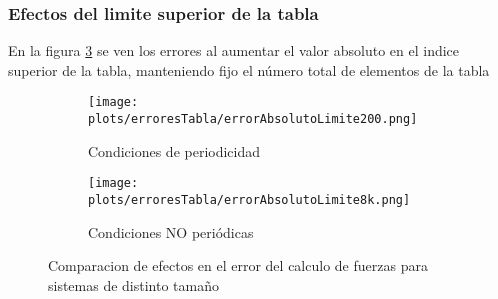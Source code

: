 % 


% 
% 
% 
% 


\subsubsection{Efectos del limite superior de la tabla}

En la figura \ref{time-vs-cut-error-superior} se ven los errores al aumentar el valor absoluto en el indice superior de la tabla, manteniendo fijo el número total de elementos de la tabla 
\begin{figure}[htbp]
\centering
\begin{subfigure}[b]{\plotwidthtres}
   \texttt{[image: plots/erroresTabla/errorAbsolutoLimite200.png]}
   \caption{Condiciones de periodicidad}
   \label{compar-1iter}
 \end{subfigure}
\begin{subfigure}[b]{\plotwidthtres}
   \texttt{[image: plots/erroresTabla/errorAbsolutoLimite8k.png]}
   \caption{Condiciones NO periódicas}
   \label{compar-niter}
 \end{subfigure}
 \caption{Comparacion de efectos en el error del calculo de fuerzas para sistemas de distinto tamaño}
 \label{time-vs-cut-error-superior}
\end{figure}








